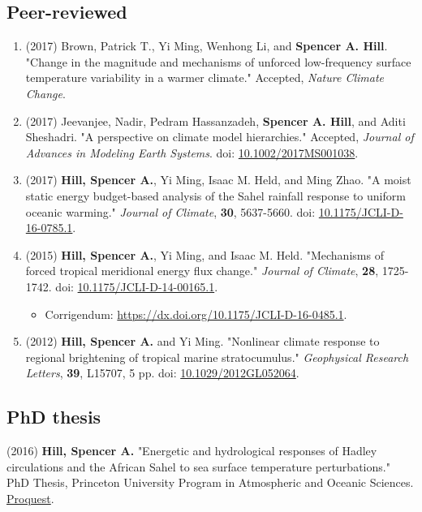 \documentclass[12pt,letterpaper]{shillcv}
\begin{document}
\subsection*{Peer-reviewed}
\label{sec:org2117510}
\begin{enumerate}
\item (2017) Brown, Patrick T., Yi Ming, Wenhong Li, and \textbf{Spencer A. Hill}.  "Change
in the magnitude and mechanisms of unforced low-frequency surface temperature
variability in a warmer climate."  Accepted, \emph{Nature Climate Change}.
\item (2017) Jeevanjee, Nadir, Pedram Hassanzadeh, \textbf{Spencer A. Hill}, and Aditi
Sheshadri.  "A perspective on climate model hierarchies."  Accepted, \emph{Journal
of Advances in Modeling Earth Systems}.  doi: \href{https://doi.org/10.1002/2017MS001038}{10.1002/2017MS001038}.
\item (2017) \textbf{Hill, Spencer A.}, Yi Ming, Isaac M. Held, and Ming Zhao.  "A moist
static energy budget-based analysis of the Sahel rainfall response to uniform
oceanic warming."  \emph{Journal of Climate}, \textbf{30}, 5637-5660.  doi:
\href{https://doi.org/10.1175/JCLI-D-16-0785.1}{10.1175/JCLI-D-16-0785.1}.
\item (2015) \textbf{Hill, Spencer A.}, Yi Ming, and Isaac M. Held.  "Mechanisms of forced
tropical meridional energy flux change."  \emph{Journal of Climate}, \textbf{28}, 1725-1742.
doi: \href{http://dx.doi.org/10.1175/JCLI-D-14-00165.1}{10.1175/JCLI-D-14-00165.1}.
\begin{itemize}
\item Corrigendum: \url{https://dx.doi.org/10.1175/JCLI-D-16-0485.1}.
\end{itemize}
\item (2012) \textbf{Hill, Spencer A.} and Yi Ming.  "Nonlinear climate response to regional
brightening of tropical marine stratocumulus."  \emph{Geophysical Research Letters},
\textbf{39}, L15707, 5 pp. doi:
\href{http://dx.doi.org/10.1029/2012GL052064}{10.1029/2012GL052064}.
\end{enumerate}
\subsection*{PhD thesis}
\label{sec:orgbfc3bb3}
(2016) \textbf{Hill, Spencer A.} "Energetic and hydrological responses of Hadley
circulations and the African Sahel to sea surface temperature perturbations."
PhD Thesis, Princeton University Program in Atmospheric and Oceanic Sciences.
\href{http://search.proquest.com.ezproxy.princeton.edu/pqdtglobal/docview/1831357756/abstract/522E2D42A8BF49C0PQ/1}{Proquest}.
\end{document}
